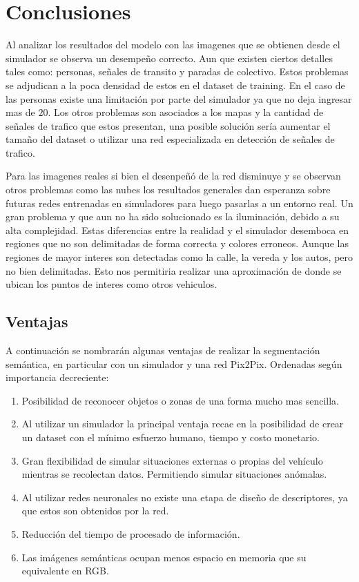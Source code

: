 \documentclass[]{IEEEtran}
\begin{document}
    \section{Conclusiones}
    
    Al analizar los resultados del modelo con las imagenes que se obtienen desde el simulador se observa un desempeño correcto. Aun que 
    existen ciertos detalles tales como: personas, señales de transito y paradas de colectivo. Estos problemas se adjudican a la poca 
    densidad de estos en el dataset de training. En el caso de las personas existe una limitación por parte del simulador ya que no 
    deja ingresar mas de $20$. Los otros problemas son asociados a los mapas y la cantidad de señales de trafico que estos presentan, una 
    posible solución sería aumentar el tamaño del dataset o utilizar una red especializada en detección de señales de trafico.

    Para las imagenes reales si bien el desenpeñó de la red disminuye y se observan otros problemas como las nubes los resultados generales 
    dan esperanza sobre futuras redes entrenadas en simuladores para luego pasarlas a un entorno real. Un gran problema y que aun no 
    ha sido solucionado es la iluminación, debido a su alta complejidad. Estas diferencias entre la realidad y el simulador desemboca 
    en regiones que no son delimitadas de forma correcta y colores erroneos. Aunque las regiones de mayor interes son detectadas como 
    la calle, la vereda y los autos, pero no bien delimitadas. Esto nos permitiria realizar una aproximación de donde se ubican los puntos 
    de interes como otros vehiculos.


    \subsection{Ventajas}

    A continuación se nombrarán algunas ventajas de realizar la segmentación semántica, en particular con un simulador y una red Pix2Pix. 
    Ordenadas según importancia decreciente:
    
    \begin{enumerate}
        \item Posibilidad de reconocer objetos o zonas de una forma
        mucho mas sencilla. 
        \item Al utilizar un simulador la principal ventaja recae en la posibilidad de crear un dataset con el mínimo esfuerzo humano, tiempo y costo monetario.
        \item Gran flexibilidad de simular situaciones externas o propias del
        vehículo mientras se recolectan datos. Permitiendo simular situaciones anómalas.
        \item Al utilizar redes neuronales no existe una etapa de diseño de descriptores, ya que estos son obtenidos por la red.
        \item Reducción del tiempo de procesado de información.
        \item Las imágenes semánticas ocupan menos espacio en memoria que su equivalente en RGB.
    \end{enumerate}
    
\end{document}
